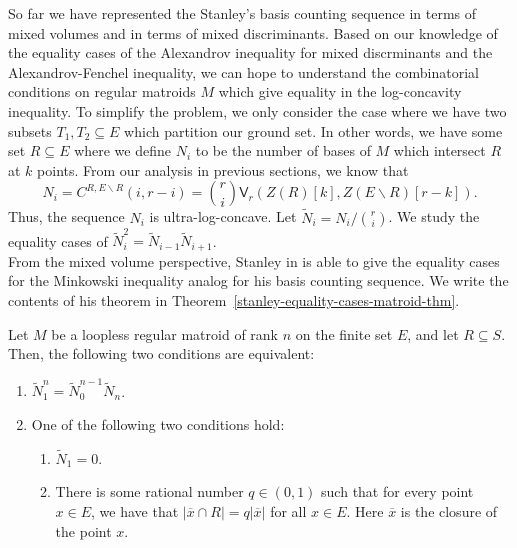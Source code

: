 \documentclass{puthesis-UG}
\begin{document}
So far we have represented the Stanley's basis counting sequence in terms of mixed volumes and in terms of mixed discriminants. Based on our knowledge of the equality cases of the Alexandrov inequality for mixed discrminants and the Alexandrov-Fenchel inequality, we can hope to understand the combinatorial conditions on regular matroids $M$ which give equality in the log-concavity inequality. To simplify the problem, we only consider the case where we have two subsets $T_1, T_2 \subseteq E$ which partition our ground set. In other words, we have some set $R \subseteq E$ where we define $N_i$ to be the number of bases of $M$ which intersect $R$ at $k$ points. From our analysis in previous sections, we know that 
\[
	N_i = C^{R, E \backslash R} (i, r-i) = \binom{r}{i} \mathsf{V}_r (Z(R)[k], Z(E \backslash R)[r-k]).
\] 
Thus, the sequence $N_i$ is ultra-log-concave. Let $\widetilde{N}_i = N_i / \binom{r}{i}$. We study the equality cases of $\widetilde{N}_i^2 = \widetilde{N}_{i-1} \widetilde{N}_{i+1}$. \\

From the mixed volume perspective, Stanley in \cite{STANLEY} is able to give the equality cases for the Minkowski inequality analog for his basis counting sequence. We write the contents of his theorem in Theorem~\ref{stanley-equality-cases-matroid-thm}.

\begin{thm}  \label{stanley-equality-cases-matroid-thm}
	Let $M$ be a loopless regular matroid of rank $n$ on the finite set $E$, and let $R \subseteq S$. Then, the following two conditions are equivalent:
	\begin{enumerate}[label = (\alph*)]
		\item $\widetilde{N}_1^n = \widetilde{N}_0^{n-1} \widetilde{N}_n$. 
		\item One of the following two conditions hold:
		\begin{enumerate}[label = (\roman*)]
			\item $\widetilde{N}_1 = 0$.
			\item There is some rational number $q \in (0, 1)$ such that for every point $x \in E$, we have that $|\overline{x} \cap R| = q |\overline{x}|$ for all $x \in E$. Here $\overline{x}$ is the closure of the point $x$.
		\end{enumerate}
	\end{enumerate}
\end{thm}
\end{document}
